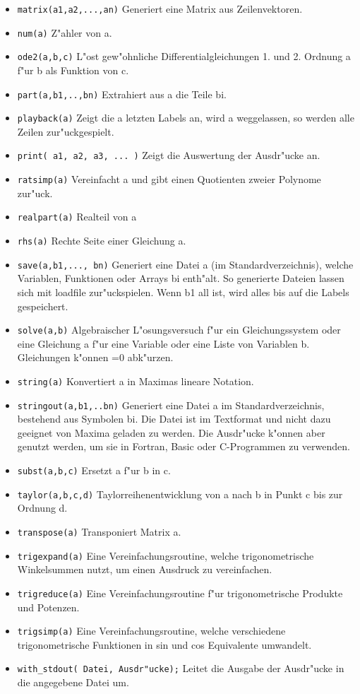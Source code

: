 \documentclass[spanish,12pt,a4paper]{article}
\begin{document}
\begin{itemize}
\item \verb|matrix(a1,a2,...,an)| Generiert eine Matrix aus Zeilenvektoren.
\item \verb|num(a)| Z"ahler von a.
\item \verb|ode2(a,b,c)| L"ost gew"ohnliche Differentialgleichungen 1. und 2. Ordnung a f"ur b als Funktion von c.
\item \verb|part(a,b1,..,bn)| Extrahiert aus a die Teile bi.
\item \verb|playback(a)| Zeigt die a letzten Labels an, wird a weggelassen, so werden alle Zeilen zur"uckgespielt.
\item \verb|print( a1, a2, a3, ... )| Zeigt die Auswertung der Ausdr"ucke an.
\item \verb|ratsimp(a)| Vereinfacht a und gibt einen Quotienten zweier Polynome zur"uck.
\item \verb|realpart(a)| Realteil von a
\item \verb|rhs(a)| Rechte Seite einer Gleichung a.
\item \verb|save(a,b1,..., bn)| Generiert eine Datei a (im Standardverzeichnis), welche Variablen, Funktionen oder Arrays bi enth"alt. So generierte Dateien lassen sich mit loadfile zur"uckspielen. Wenn b1 all ist, wird alles bis auf die Labels gespeichert.
\item \verb|solve(a,b)| Algebraischer L"osungsversuch f"ur ein Gleichungssystem oder eine Gleichung a f"ur eine Variable oder eine Liste von Variablen b. Gleichungen k"onnen =0 abk"urzen.
\item \verb|string(a)| Konvertiert a in Maximas lineare Notation.
\item \verb|stringout(a,b1,..bn)| Generiert eine Datei a im Standardverzeichnis, bestehend aus Symbolen bi. Die Datei ist im Textformat und nicht dazu geeignet von Maxima geladen zu werden. Die Ausdr"ucke k"onnen aber genutzt werden, um sie in Fortran, Basic oder C-Programmen zu verwenden.
\item \verb|subst(a,b,c)| Ersetzt a f"ur b in c.
\item \verb|taylor(a,b,c,d)| Taylorreihenentwicklung von a nach b in Punkt c bis zur Ordnung d.
\item \verb|transpose(a)| Transponiert Matrix a.
\item \verb|trigexpand(a)| Eine Vereinfachungsroutine, welche trigonometrische Winkelsummen nutzt, um einen Ausdruck zu vereinfachen.
\item \verb|trigreduce(a)| Eine Vereinfachungsroutine f"ur trigonometrische Produkte und Potenzen.
\item \verb|trigsimp(a)| Eine Vereinfachungsroutine, welche verschiedene trigonometrische Funktionen in sin und cos Equivalente umwandelt.
\item \verb|with_stdout( Datei, Ausdr"ucke);| Leitet die Ausgabe der Ausdr"ucke in die angegebene Datei um.
\end{itemize}
\end{document}
